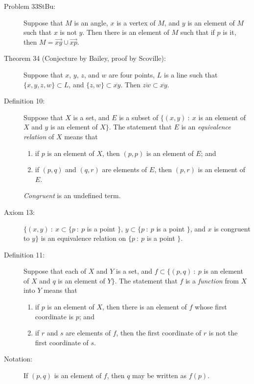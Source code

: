 \documentclass{article}
\begin{document}
\begin{description}
  \item[Problem 33StBu:] Suppose that $M$ is an angle, $x$ is a vertex of $M$, and $y$ is an element of $M$ such that $x$ is not $y$. Then there is an element of $M$ such that if $p$ is it, then $M = \overrightarrow{xy} \cup \overrightarrow{xp}$.

  \item[Theorem 34 (Conjecture by Bailey, proof by Scoville):] Suppose that $x$, $y$, $z$, and $w$ are four points, $L$ is a line such that $\{ x,y,z,w \} \subset L$, and $\{ z,w \} \subset \overline{xy}$. Then $\overline{zw} \subset \overline{xy}$.

  \item[Definition 10:] Suppose that $X$ is a set, and $E$ is a subset of $\{ (x,y)\ :\ x$ is an element of $X$ and $y$ is an element of $X \}$. The statement that $E$ is an \emph{equivalence relation} of $X$ means that
    \begin{enumerate}[\hspace{1cm}(i.)]
      \item if $p$ is an element of $X$, then $(p,p)$ is an element of $E$; and
      \item if $(p,q)$ and $(q,r)$ are elements of $E$, then $(p,r)$ is an element of $E$.
    \end{enumerate}

  \item[] \emph{Congruent} is an undefined term.

  \item[Axiom 13:] $\{ (x,y)\ :\ x \subset \{ p\ :\ p$ is a point $\}$, $y \subset \{ p\ :\ p$ is a point $\}$, and $x$ is congruent to $y \}$ is an equivalence relation on $\{ p\ :\ p$ is a point $\}$.

  \item[Definition 11:] Suppose that each of $X$ and $Y$ is a set, and $f \subset \{ (p,q)\ :\ p$ is an element of $X$ and $q$ is an element of $Y \}$. The statement that $f$ is a \emph{function} from $X$ into $Y$ means that
    \begin{enumerate}[\hspace{1cm}(i.)]
      \item if $p$ is an element of $X$, then there is an element of $f$ whose first coordinate is $p$; and
      \item if $r$ and $s$ are elements of $f$, then the first coordinate of $r$ is not the first coordinate of $s$.
    \end{enumerate}

  \item[Notation:] If $(p,q)$ is an element of $f$, then $q$ may be written as $f(p)$.


\end{description}
\end{document}
